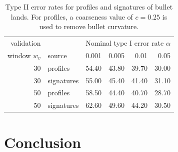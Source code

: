 \documentclass[12pt]{article}
\begin{document}
\begin{table}[ht]
\caption{\label{tab:type2} Type II error rates for profiles and signatures of bullet lands. For profiles, a coarseness value of $c = 0.25$ is used to remove bullet curvature.}
\centering
\begin{tabular}{rlrrrr}
  \hline
validation && \multicolumn{4}{l}{Nominal type I error rate $\alpha$}\\  
window $w_v$ & source & 0.001 & 0.005 & 0.01 & 0.05 \\ 
  \hline
 30 & profiles & 54.40 & 43.80 & 39.70 & 30.00 \\ 
   30 & signatures & 55.00 & 45.40 & 41.40 & 31.10 \\ \hline
   50 & profiles & 58.50 & 44.40 & 40.70 & 28.70 \\ 
   50 & signatures & 62.60 & 49.60 & 44.20 & 30.50 \\ 
   \hline
\end{tabular}
\end{table}

\section{Conclusion}\label{conclusion}
\end{document}
